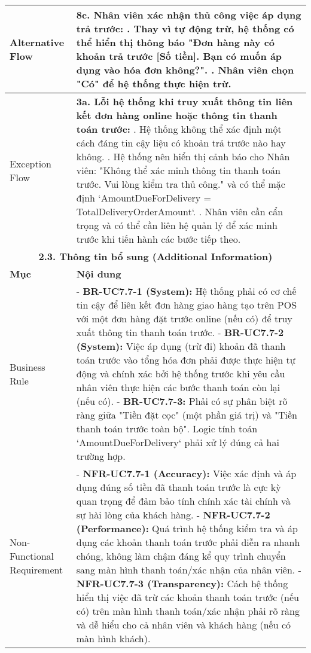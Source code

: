 \begin{longtable}{|m{4cm}|p{11cm}|}
\hline
Alternative Flow & \textbf{8c. Nhân viên xác nhận thủ công việc áp dụng trả trước:} \newline    1. Thay vì tự động trừ, hệ thống có thể hiển thị thông báo "Đơn hàng này có khoản trả trước [Số tiền]. Bạn có muốn áp dụng vào hóa đơn không?". \newline    2. Nhân viên chọn "Có" để hệ thống thực hiện trừ. \\
\hline
Exception Flow & \textbf{3a. Lỗi hệ thống khi truy xuất thông tin liên kết đơn hàng online hoặc thông tin thanh toán trước:} \newline    1. Hệ thống không thể xác định một cách đáng tin cậy liệu có khoản trả trước nào hay không. \newline    2. Hệ thống nên hiển thị cảnh báo cho Nhân viên: "Không thể xác minh thông tin thanh toán trước. Vui lòng kiểm tra thủ công." và có thể mặc định `AmountDueForDelivery = TotalDeliveryOrderAmount`. \newline    3. Nhân viên cần cẩn trọng và có thể cần liên hệ quản lý để xác minh trước khi tiến hành các bước tiếp theo. \\
\hline
\multicolumn{2}{|c|}{\textbf{2.3. Thông tin bổ sung (Additional Information)}} \\
\hline
\textbf{Mục} & \textbf{Nội dung} \\
\hline
Business Rule & - \textbf{BR-UC7.7-1 (System):} Hệ thống phải có cơ chế tin cậy để liên kết đơn hàng giao hàng tạo trên POS với một đơn hàng đặt trước online (nếu có) để truy xuất thông tin thanh toán trước. \newline - \textbf{BR-UC7.7-2 (System):} Việc áp dụng (trừ đi) khoản đã thanh toán trước vào tổng hóa đơn phải được thực hiện tự động và chính xác bởi hệ thống trước khi yêu cầu nhân viên thực hiện các bước thanh toán còn lại (nếu có). \newline - \textbf{BR-UC7.7-3:} Phải có sự phân biệt rõ ràng giữa "Tiền đặt cọc" (một phần giá trị) và "Tiền thanh toán trước toàn bộ". Logic tính toán `AmountDueForDelivery` phải xử lý đúng cả hai trường hợp. \\
\hline
Non-Functional Requirement & - \textbf{NFR-UC7.7-1 (Accuracy):} Việc xác định và áp dụng đúng số tiền đã thanh toán trước là cực kỳ quan trọng để đảm bảo tính chính xác tài chính và sự hài lòng của khách hàng. \newline - \textbf{NFR-UC7.7-2 (Performance):} Quá trình hệ thống kiểm tra và áp dụng các khoản thanh toán trước phải diễn ra nhanh chóng, không làm chậm đáng kể quy trình chuyển sang màn hình thanh toán/xác nhận của nhân viên. \newline - \textbf{NFR-UC7.7-3 (Transparency):} Cách hệ thống hiển thị việc đã trừ các khoản thanh toán trước (nếu có) trên màn hình thanh toán/xác nhận phải rõ ràng và dễ hiểu cho cả nhân viên và khách hàng (nếu có màn hình khách). \\
\hline
\end{longtable}

